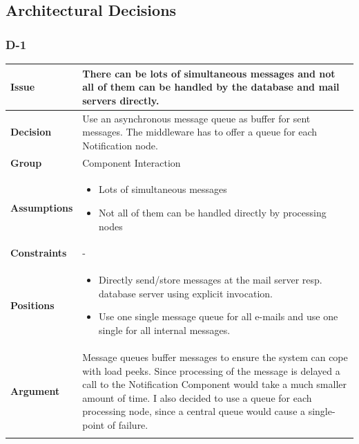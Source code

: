 \documentclass[11pt]{article}
\begin{document}
\subsection{Architectural Decisions}

\subsubsection{D-1}

\begin{table}[h] \small
	\begin{tabularx}{\textwidth}{ | l | X |}
    	\hline
	\cellcolor[gray]{0.9}
    	\textbf{Issue} & There can be lots of simultaneous messages and not all of them can be handled by the database and mail servers directly. \\
	\hline
	\cellcolor[gray]{0.9}
	\textbf{Decision} & Use an asynchronous message queue as buffer for sent messages. The middleware has to offer a queue for each Notification node. \\ 
	\hline
	\cellcolor[gray]{0.9}
	\textbf{Group} & Component Interaction \\ 
	\hline
	\cellcolor[gray]{0.9}
	\textbf{Assumptions} & 
		\begin{itemize}
		\item Lots of simultaneous messages
		\item Not all of them can be handled directly by processing nodes 
		\end{itemize} \\ 
	\hline
	\cellcolor[gray]{0.9}
	\textbf{Constraints} & - \\ 
	\hline
	\cellcolor[gray]{0.9}
	\textbf{Positions} &  
		\begin{itemize}
		\item Directly send/store messages at the mail server resp. database server using explicit invocation.
		\item Use one single message queue for all e-mails and use one single for all internal messages.
		\end{itemize} \\ 	
	\hline
	\cellcolor[gray]{0.9}
	\textbf{Argument} & Message queues buffer messages to ensure the system can cope with load peeks. Since processing of the message is delayed a call to the Notification Component would take a much smaller amount of time. I also decided to use a queue for each processing node, since a central queue would cause a single-point of failure. \\ 
	\hline
	\cellcolor[gray]{0.9}

\end{tabularx}
\end{table}
\end{document}
